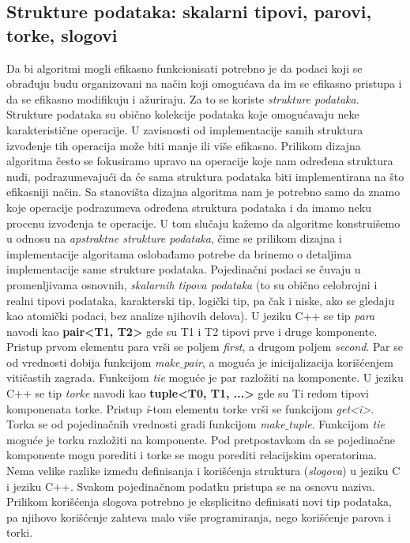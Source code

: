 \documentclass{article}
\begin{document}
\subsection{Strukture podataka: skalarni tipovi, parovi, torke, slogovi}
Da bi algoritmi mogli efikasno funkcionisati potrebno je da podaci koji se obrađuju
budu organizovani na način koji omogućava da im se efikasno pristupa i da se
efikasno modifikuju i ažuriraju. Za to se koriste \textit{strukture podataka}. Strukture podataka su obično kolekcije podataka koje omogućavaju neke karakteristične operacije. U zavisnosti od implementacije samih struktura izvođenje
tih operacija može biti manje ili više efikasno. Prilikom dizajna algoritma često se
fokusiramo upravo na operacije koje nam određena struktura nudi, podrazumevajući da će sama struktura podataka biti implementirana na što efikasniji način.
Sa stanovišta dizajna algoritma nam je potrebno samo da znamo koje operacije
podrazumeva određena struktura podataka i da imamo neku procenu izvođenja te operacije. U tom slučaju kažemo
da algoritme konstruišemo u odnosu na \textit{apstraktne strukture podataka}, čime se
prilikom dizajna i implementacije algoritama oslobađamo potrebe da brinemo
o detaljima implementacije same strukture podataka.
\newline
Pojedinačni podaci se čuvaju u promenljivama osnovnih, \textit{skalarnih tipova podataka} (to su obično celobrojni i realni tipovi podataka, karakterski tip, logički
tip, pa čak i niske, ako se gledaju kao atomički podaci, bez analize njihovih
delova).
\newline U jeziku C++ se tip \textit{para} navodi kao \textbf{pair<T1, T2>} gde su T1 i T2 tipovi prve
i druge komponente. Pristup prvom elementu para vrši se poljem \textit{first}, a
drugom poljem \textit{second}. Par se od vrednosti dobija funkcijom \textit{make$\_$pair}, a
moguća je inicijalizacija korišćenjem vitičastih zagrada. Funkcijom \textit{tie} moguće je par razložiti na komponente.
\newline U jeziku C++ se tip \textit{torke} navodi kao \textbf{tuple<T0, T1, ...>} gde su Ti redom
tipovi komponenata torke. Pristup \textit{i}-tom elementu torke vrši se funkcijom\textit{ get<i>}.
Torka se od pojedinačnih vrednosti gradi funkcijom\textit{ make$\_$tuple}. Funkcijom \textit{tie}
moguće je torku razložiti na komponente. Pod pretpostavkom da se pojedinačne
komponente mogu porediti i torke se mogu porediti relacijskim operatorima.
\newline Nema velike razlike između definisanja i korišćenja struktura (\textit{slogova}) u jeziku C i jeziku C++. Svakom pojedinačnom podatku pristupa se na osnovu naziva. Prilikom
korišćenja slogova potrebno je eksplicitno definisati novi tip podataka, pa njihovo
korišćenje zahteva malo više programiranja, nego korišćenje parova i torki.
\end{document}
